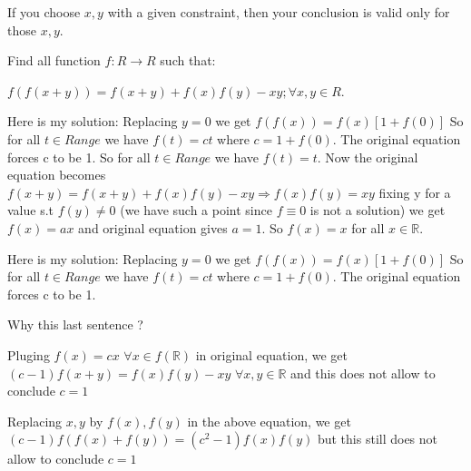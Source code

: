 \begin{solution}
	If you choose $x,y$ with a given constraint, then your conclusion is valid only for those $x,y$.
\end{solution}



\begin{solution}
	\begin{tcolorbox}Find all function $f:R \rightarrow R$ such that:

$f(f(x+y))=f(x+y)+f(x)f(y)-xy;\forall x,y \in R$.\end{tcolorbox}
Here is my solution: Replacing $y=0$ we get $f(f(x))=f(x)[1+f(0)]$ So for all $t \in Range$ we have $f(t)=ct$ where $c=1+f(0).$
The original equation forces c to be 1. So for all $t \in Range$ we have $f(t)=t.$
Now the original equation becomes 
$f(x+y)=f(x+y)+f(x)f(y)-xy \Longrightarrow f(x)f(y)=xy$ fixing y for a value s.t $f(y) \neq 0$ (we have such a point since $f \equiv 0$ is not a solution) we get $f(x)=ax$ and original equation gives $a=1.$
So $f(x)=x$ for all $x \in \mathbb{R}.$
\end{solution}



\begin{solution}
	\begin{tcolorbox}Here is my solution: Replacing $y=0$ we get $f(f(x))=f(x)[1+f(0)]$ So for all $t \in Range$ we have $f(t)=ct$ where $c=1+f(0).$
The original equation forces c to be 1. \end{tcolorbox}
Why this last sentence ?

Pluging $f(x)=cx$ $\forall x\in f(\mathbb R)$ in original equation, we get $(c-1)f(x+y)=f(x)f(y)-xy$ $\forall x,y\in\mathbb R$ and this does not allow to conclude $c=1$

Replacing $x,y$ by $f(x),f(y)$ in the above equation, we get $(c-1)f(f(x)+f(y))=(c^2-1)f(x)f(y)$ but this still does not allow to conclude $c=1$
\end{solution}



